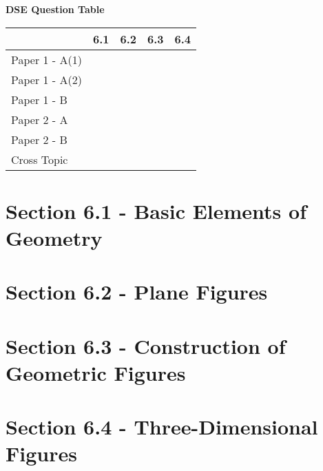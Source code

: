 \documentclass[12pt, a4paper]{article}
\begin{document}
\begin{absolutelynopagebreak}
\begin{center}
\textbf{DSE Question Table}
\end{center}
\begin{center}
\begin{tabular}{|l|c|c|c|c|}
\hline
        & 6.1 & 6.2 & 6.3 & 6.4 \\\hline
\hline
Paper 1 - A(1)&  &  &  &  \\
\hline
Paper 1 - A(2)&  &  &  &  \\
\hline
Paper 1 - B&  &  &  &  \\
\hline
\hline
Paper 2 - A&  &  &  &  \\
\hline
Paper 2 - B&  &  &  &  \\
\hline
\hline
Cross Topic&  &  &  &  \\
\hline
\end{tabular}
\end{center}
\end{absolutelynopagebreak}




\section*{Section 6.1 - Basic Elements of Geometry}\label{section:1-6-1}





\section*{Section 6.2 - Plane Figures}\label{section:1-6-2}





\section*{Section 6.3 - Construction of Geometric Figures}\label{section:1-6-3}





\section*{Section 6.4 - Three-Dimensional Figures}\label{section:1-6-4}
\end{document}
